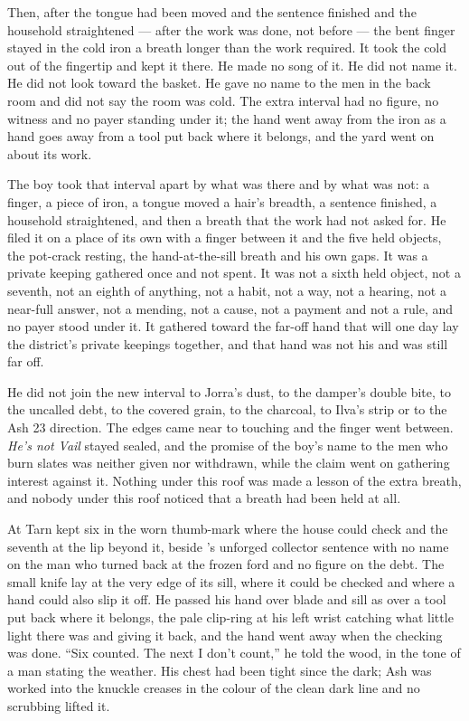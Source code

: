 Then, after the tongue had been moved and the sentence finished and the household straightened --- after the work was done, not before --- the bent finger stayed in the cold iron a breath longer than the work required. It took the cold out of the fingertip and kept it there. He made no song of it. He did not name it. He did not look toward the basket. He gave no name to the men in the back room and did not say the room was cold. The extra interval had no figure, no witness and no payer standing under it; the hand went away from the iron as a hand goes away from a tool put back where it belongs, and the yard went on about its work.

The boy took that interval apart by what was there and by what was not: a finger, a piece of iron, a tongue moved a hair's breadth, a sentence finished, a household straightened, and then a breath that the work had not asked for. He filed it on a place of its own with a finger between it and the five held objects, the pot-crack resting, the hand-at-the-sill breath and his own gaps. It was a private keeping gathered once and not spent. It was not a sixth held object, not a seventh, not an eighth of anything, not a habit, not a way, not a hearing, not a near-full answer, not a mending, not a cause, not a payment and not a rule, and no payer stood under it. It gathered toward the far-off hand that will one day lay the district's private keepings together, and that hand was not his and was still far off.

He did not join the new interval to Jorra's dust, to the damper's double bite, to the uncalled debt, to the covered grain, to the charcoal, to Ilva's strip or to the Ash 23 direction. The edges came near to touching and the finger went between. \emph{He's not Vail} stayed sealed, and the promise of the boy's name to the men who burn slates was neither given nor withdrawn, while the claim went on gathering interest against it. Nothing under this roof was made a lesson of the extra breath, and nobody under this roof noticed that a breath had been held at all.

\scenebreak

At  Tarn kept six in the worn thumb-mark where the house could check and the seventh at the lip beyond it, beside 's unforged collector sentence with no name on the man who turned back at the frozen ford and no figure on the debt. The small knife lay at the very edge of its sill, where it could be checked and where a hand could also slip it off. He passed his hand over blade and sill as over a tool put back where it belongs, the pale clip-ring at his left wrist catching what little light there was and giving it back, and the hand went away when the checking was done. “Six counted. The next I don't count,” he told the wood, in the tone of a man stating the weather. His chest had been tight since the dark; Ash was worked into the knuckle creases in the colour of the clean dark line and no scrubbing lifted it.

